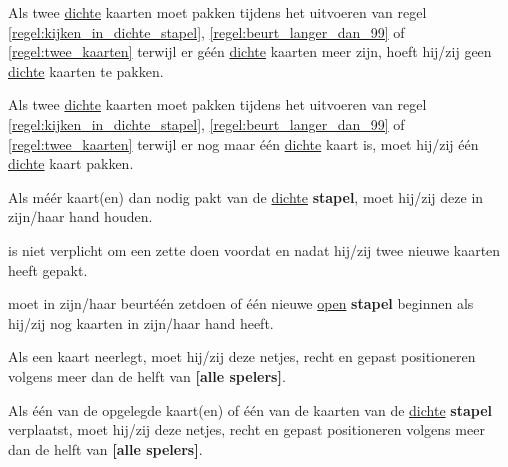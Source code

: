 \vervolgLijst{}
    \item Als \eenSpeler twee \ul{dichte} kaarten moet pakken tijdens het uitvoeren van regel \ref{regel:kijken_in_dichte_stapel}, \ref{regel:beurt_langer_dan_99} of \ref{regel:twee_kaarten} terwijl er g\'e\'en \ul{dichte} kaarten meer zijn, hoeft hij/zij geen \ul{dichte} kaarten te pakken.
    \label{item:geen_kaart_1}
\eindLijst{}

\vervolgLijst{}
    \item Als \eenSpeler twee \ul{dichte} kaarten moet pakken tijdens het uitvoeren van regel \ref{regel:kijken_in_dichte_stapel}, \ref{regel:beurt_langer_dan_99} of \ref{regel:twee_kaarten} terwijl er nog maar \'e\'en \ul{dichte} kaart is, moet hij/zij \'e\'en \ul{dichte} kaart pakken.
    \label{item:geen_kaart_2}
\eindLijst{}

\vervolgLijst{}
    \item Als \eenSpeler méér kaart(en) dan nodig pakt van de \ul{dichte} \textbf{stapel}, moet hij/zij deze in zijn/haar hand houden.
\eindLijst{}

\vervolgLijst{}
    \item \EenSpeler is niet verplicht om een zet\footnotemark[3] te doen voordat en nadat hij/zij twee nieuwe kaarten heeft gepakt.
\eindLijst{}

\vervolgLijst{}
    \item \EenSpeler moet in zijn/haar beurt\footnotemark[1] \'e\'en zet\footnotemark[3] doen of \'e\'en nieuwe \ul{open} \textbf{stapel} beginnen als hij/zij nog kaarten in zijn/haar hand heeft.
\eindLijst{}


\newpage
{}


\vervolgLijst{}
    \item Als \eenSpeler een kaart neerlegt, moet hij/zij deze netjes, recht en gepast positioneren volgens meer dan de helft van \textbf{[alle spelers]}.
    \label{regel:kaart_netjes_1}
\eindLijst{}

\vervolgLijst{}
    \item Als \eenSpeler één van de opgelegde kaart(en) of één van de kaarten van de \ul{dichte} \textbf{stapel} verplaatst, moet hij/zij deze netjes, recht en gepast positioneren volgens meer dan de helft van \textbf{[alle spelers]}.
    \label{regel:kaart_netjes_2} 
\eindLijst{}

